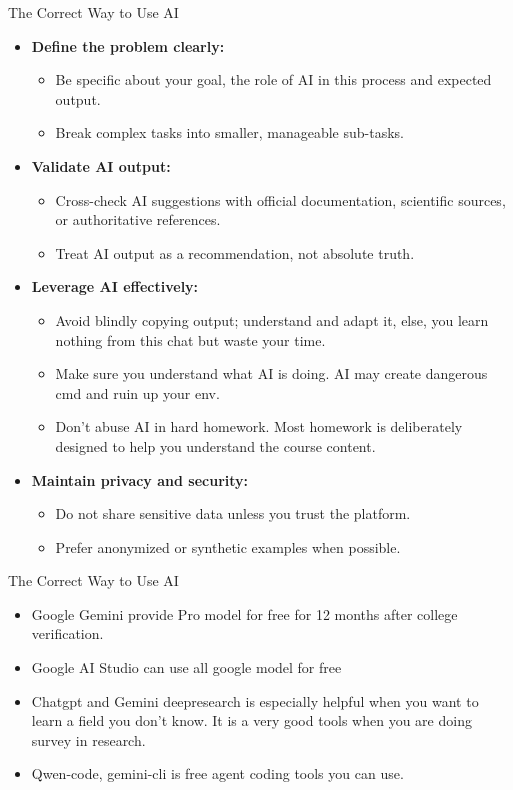 \begin{frame}[fragile]{The Correct Way to Use AI}
    \begin{itemize}
        \item \textbf{Define the problem clearly:}
        \begin{itemize}
            \item Be specific about your goal, the role of AI in this process and expected output.
            \item Break complex tasks into smaller, manageable sub-tasks.
        \end{itemize}

        \item \textbf{Validate AI output:}
        \begin{itemize}
            \item Cross-check AI suggestions with official documentation, scientific sources, or authoritative references.
            \item Treat AI output as a recommendation, not absolute truth.
        \end{itemize}

        \item \textbf{Leverage AI effectively:}
        \begin{itemize}
            \item Avoid blindly copying output; understand and adapt it, else, you learn nothing from this chat but waste your time.
            \item Make sure you understand what AI is doing. AI may create dangerous cmd and ruin up your env.
            \item Don't abuse AI in hard homework. Most homework is deliberately designed to help you understand the course content.
        \end{itemize}

        \item \textbf{Maintain privacy and security:}
        \begin{itemize}
            \item Do not share sensitive data unless you trust the platform.
            \item Prefer anonymized or synthetic examples when possible.
        \end{itemize}
    \end{itemize}
\end{frame}

\begin{frame}[fragile]{The Correct Way to Use AI}
    \begin{itemize}
			\item Google Gemini provide Pro model for free for 12 months after college verification.
			\item Google AI Studio can use all google model for free
			\item Chatgpt and Gemini deepresearch is especially helpful when you want to learn a field you don't know. It is a very good tools when you are doing survey in research.
			\item Qwen-code, gemini-cli is free agent coding tools you can use.
    \end{itemize}
\end{frame}
